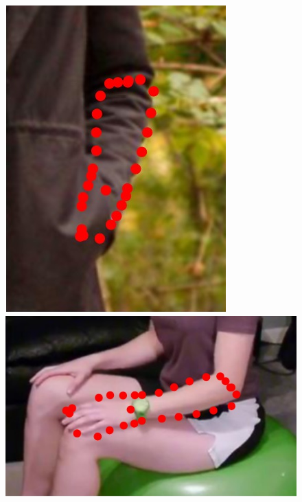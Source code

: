 \begin{figure}
    \newcommand{\ofh}{0.179\textwidth}
    \centering
    \includegraphics[height=\ofh]{resources/Annotation_Correction/Suplementory_Meterial/ExFit/0001}
    \hfill
    \includegraphics[height=\ofh]{resources/Annotation_Correction/Suplementory_Meterial/ExFit/0002}
    \hfill

\end{figure}
